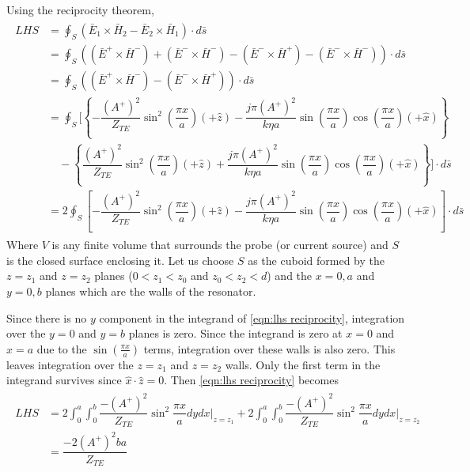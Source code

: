 Using the reciprocity theorem,
\begin{align}
\begin{split}
\label{eqn:lhs reciprocity}
LHS&=\oint_S \left( \bar{E}_1 \times\bar{H}_2 - \bar{E}_2 \times\bar{H}_1\right)\cdot d\bar{s}\\
&= \oint_S \left( (\bar{E}^+ \times\bar{H}^-) +(\bar{E}^- \times\bar{H}^-) - (\bar{E}^- \times\bar{H}^+)-(\bar{E}^- \times\bar{H}^-)\right)\cdot d\bar{s}\\
&=\oint_S \left( (\bar{E}^+ \times\bar{H}^-) - (\bar{E}^- \times\bar{H}^+)\right)\cdot d\bar{s}\\
&=\oint_S\biggl[ \left\lbrace-\dfrac{(A^+)^2}{Z_{TE}}\sin^2\left(\dfrac{\pi x}{a}\right)(+\hat{z})-\dfrac{j\pi (A^+)^2}{k\eta a}\sin\left(\dfrac{\pi x}{a}\right)\cos\left(\dfrac{\pi x}{a}\right)(+\hat{x})\right\rbrace\\
&\quad-\left\lbrace\dfrac{(A^+)^2}{Z_{TE}}\sin^2\left(\dfrac{\pi x}{a}\right)(+\hat{z})+\dfrac{j\pi (A^+)^2}{k\eta a}\sin\left(\dfrac{\pi x}{a}\right)\cos\left(\dfrac{\pi x}{a}\right)(+\hat{x})\right\rbrace\biggr]\cdot d\bar{s}\\
&=2\oint_S \left[-\dfrac{(A^+)^2}{Z_{TE}}\sin^2\left(\dfrac{\pi x}{a}\right)(+\hat{z})-\dfrac{j\pi (A^+)^2}{k\eta a}\sin\left(\dfrac{\pi x}{a}\right)\cos\left(\dfrac{\pi x}{a}\right)(+\hat{x})\right]\cdot d\bar{s}
\end{split}
\end{align}
Where $V$ is any finite volume that surrounds the probe (or current source) and $S$ is the closed surface enclosing it. Let us choose $S$ as the cuboid formed by the $z=z_1$ and $z=z_2$ planes ($0<z_1<z_0$ and $z_0<z_2<d$) and the $x=0,a$ and $y=0,b$ planes which are the walls of the resonator.

Since there is no $y$ component in the integrand of \ref{eqn:lhs reciprocity}, integration over the $y=0$ and $y=b$ planes is zero.
Since the integrand is zero at $x=0$ and $x=a$ due to the $\sin\left(\tfrac{\pi x}{a}\right)$ terms, integration over these walls is also zero.
This leaves integration over the $z=z_1$ and $z=z_2$ walls.
Only the first term in the integrand survives since $\hat{x}\cdot\hat{z}=0$. Then \ref{eqn:lhs reciprocity} becomes
\begin{align}
\begin{split}
LHS&=2\int^a_0\int^b_0 \dfrac{-(A^+)^2}{Z_{TE}}\sin^2\dfrac{\pi x}{a}dydx\bigg|_{z=z_1} + 2\int^a_0\int^b_0 \dfrac{-(A^+)^2}{Z_{TE}}\sin^2\dfrac{\pi x}{a}dydx\bigg|_{z=z_2}\\
&=\dfrac{-2(A^+)^2ba}{Z_{TE}}
\end{split}
\end{align}

